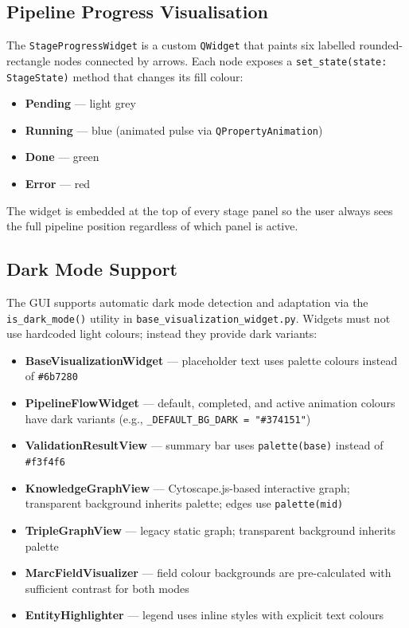 \documentclass[12pt]{article}
\newcommand{\filepath}[1]{\texttt{\small #1}}
\newcommand{\code}[1]{\texttt{#1}}
\begin{document}
\subsection{Pipeline Progress Visualisation}

The \code{StageProgressWidget} is a custom \code{QWidget} that paints six labelled rounded-rectangle nodes connected by arrows. Each node exposes a \code{set\_state(state: StageState)} method that changes its fill colour:

\begin{itemize}
\item \textbf{Pending} --- light grey
\item \textbf{Running} --- blue (animated pulse via \code{QPropertyAnimation})
\item \textbf{Done} --- green
\item \textbf{Error} --- red
\end{itemize}

The widget is embedded at the top of every stage panel so the user always sees the full pipeline position regardless of which panel is active.

\subsection{Dark Mode Support}
\label{sec:dark-mode}

The GUI supports automatic dark mode detection and adaptation via the \code{is\_dark\_mode()} utility in \filepath{base\_visualization\_widget.py}. Widgets must not use hardcoded light colours; instead they provide dark variants:

\begin{itemize}
\item \textbf{BaseVisualizationWidget} --- placeholder text uses palette colours instead of \code{\#6b7280}
\item \textbf{PipelineFlowWidget} --- default, completed, and active animation colours have dark variants (e.g., \code{\_DEFAULT\_BG\_DARK = "\#374151"})
\item \textbf{ValidationResultView} --- summary bar uses \code{palette(base)} instead of \code{\#f3f4f6}
\item \textbf{KnowledgeGraphView} --- Cytoscape.js-based interactive graph; transparent background inherits palette; edges use \code{palette(mid)}
\item \textbf{TripleGraphView} --- legacy static graph; transparent background inherits palette
\item \textbf{MarcFieldVisualizer} --- field colour backgrounds are pre-calculated with sufficient contrast for both modes
\item \textbf{EntityHighlighter} --- legend uses inline styles with explicit text colours
\end{itemize}
\end{document}
